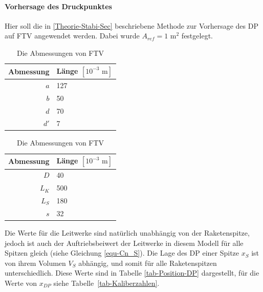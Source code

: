 \documentclass[10pt,a4paper]{article}
\begin{document}
\paragraph{Vorhersage des Druckpunktes}
Hier soll die in \ref{Theorie-Stabi-Sec} beschriebene Methode zur Vorhersage des DP auf FTV angewendet werden. Dabei wurde $A_{ref} = 1 \text{ m}^{2}$ festgelegt.

\begin{table}[H]
\caption{Die Abmessungen von FTV}
\centering
\begin{subtable}[c]{.35\textwidth}
	\begin{tabular}{r|l}
	\toprule
	Abmessung	& Länge $[10^{-3} \text{ m}]$\\
	\midrule
	$a$			& 127	\\
	$b$			& 50	\\
	$d$			& 70	\\
	$d'$		& 7		\\
	\bottomrule
	\end{tabular}
\end{subtable}
\begin{subtable}[c]{.35\textwidth}
	\begin{tabular}{r|l}
	\toprule
	Abmessung	& Länge $[10^{-3} \text{ m}]$\\
	\midrule
	$D$			& 40	\\
	$L_{K}$		& 500	\\
	$L_{S}$		& 180	\\
	$s$			& 32	\\
	\bottomrule
	\end{tabular}
\end{subtable}
\label{Abmessungen-Tab}
\end{table}

\noindent
Die Werte für die Leitwerke sind natürlich unabhängig von der Raketenspitze, jedoch ist auch der Auftriebsbeiwert der Leitwerke in diesem Modell für alle Spitzen gleich (siehe Gleichung \eqref{equ-Cn_S}).
Die Lage des DP einer Spitze $x_{S}$ ist von ihrem Volumen $V_{S}$ abhängig, und somit für alle Raketenspitzen unterschiedlich. Diese Werte sind in Tabelle \ref{tab-Position-DP} dargestellt, für die Werte von $x_{DP}$ siehe Tabelle~\ref{tab-Kaliberzahlen}.
\end{document}
